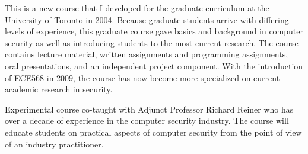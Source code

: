 \begin{rtext}
     This is a new course that I developed for the graduate curriculum at the University of Toronto in 2004.  Because graduate students arrive with differing levels of experience, this graduate course gave basics and background in computer security as well as introducing students to the most current research.  The course contains lecture material, written assignments and programming assignments, oral presentations, and an independent project component. With the introduction of ECE568 in 2009, the course has now become more specialized on current academic research in security.
    
     Experimental course co-taught with Adjunct Professor Richard Reiner who has over a decade of experience in the computer security industry.  The course will educate students on practical aspects of computer security from the point of view of an industry practitioner.
\end{rtext}